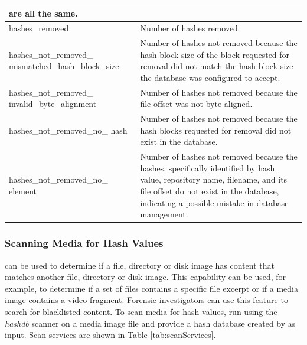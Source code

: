 \documentclass[11pt,fleqn]{article} %
\begin{document}
\begin{table}[!ht]
\begin{tabular}{|p{5 cm}|p{8.8 cm}|}
are all the same.\\
\hline
hashes\_removed& Number of hashes removed \\
\hline
hashes\_not\_removed\_ mismatched\_hash\_block\_size& Number of hashes not removed because the hash block size of the block requested for removal did not match the hash block size the database was configured to accept.
\\
\hline
hashes\_not\_removed\_ invalid\_byte\_alignment &  Number of hashes not removed because the file offset was not byte aligned.\\
\hline
hashes\_not\_removed\_no\_ hash&  Number of hashes not removed because the hash blocks requested for removal did not exist in the database.\\
\hline
hashes\_not\_removed\_no\_ element&  Number of hashes not removed because the hashes, specifically identified by 
hash value, repository name, filename, and its file offset do not exist in the database, indicating a possible mistake in database management.\\
\hline
\end{tabular}
\end{table}


\subsubsection{Scanning Media for Hash Values}
\hash can be used to determine if a file, directory or disk image has content that matches another file, directory or disk image. This capability can be used, for example, to determine if a set of files contains a specific file excerpt or if a media image contains a video fragment. Forensic investigators can use this feature to search for blacklisted content. To scan media for hash values, run using the \bulk \textit{hashdb} scanner on a media image file and provide a hash database created by \hash as input.
Scan services are shown in Table \ref{tab:scanServices}. \\
\end{document}
